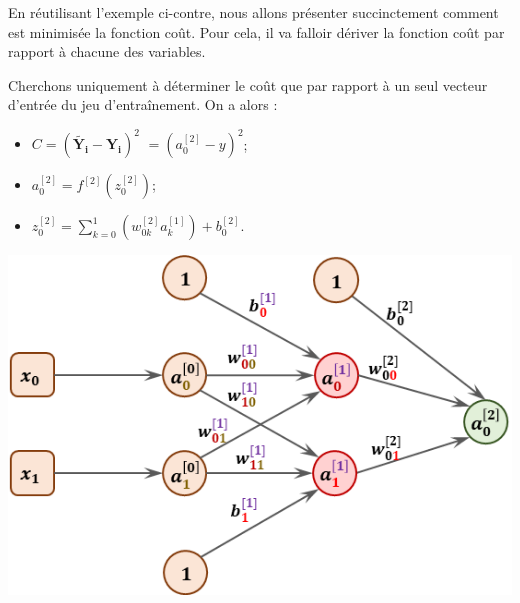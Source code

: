 \begin{minipage}[c]{.55\linewidth}
En réutilisant l'exemple ci-contre, nous allons présenter succinctement comment est minimisée la fonction coût.
Pour cela, il va falloir dériver la fonction coût par rapport à chacune des variables. 

Cherchons uniquement à déterminer le coût que par rapport à un seul vecteur d'entrée du jeu d'entraînement. On a alors : 
\begin{itemize}
\item $C = \left( \mathbf{\tilde{Y_i}} - \mathbf{Y_i}  \right)^2$ $= \left( a^{[2]}_{0} - y  \right)^2$;
\item $ a^{[2]}_{0} = f^{[2]}\left(z_0^{[2]}\right)$;
\item $z_0^{[2]} =\sum\limits_{k=0}^{1}\left( w^{[2]}_{0k} a_k^{[1]} \right) + b^{[2]}_{0}$.
\end{itemize}

\end{minipage}\hfill
\begin{minipage}[c]{.4\linewidth}
\begin{center}
\includegraphics[width=.9\linewidth]{images/fig_05}
\end{center}
%
\end{minipage}


